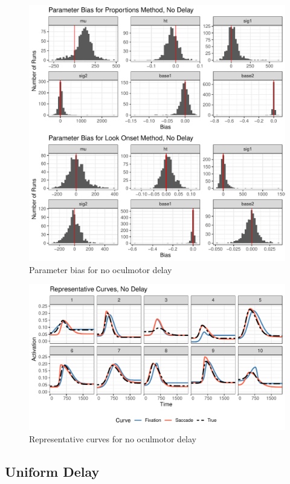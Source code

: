 \documentclass{article}
\begin{document}
\begin{figure}[H]
\centering
\includegraphics{dg_no_delay_par_bias.pdf}
\caption{Parameter bias for no oculmotor delay}
\label{fig:par_bias_no_delay}
\end{figure}

\begin{figure}[H]
\centering
\includegraphics{dg_rep_curves_no_delay.pdf}
\caption{Representative curves for no oculmotor delay}
\label{fig:rep_curves_no_delay}
\end{figure}


\subsection{Uniform Delay}
\end{document}
